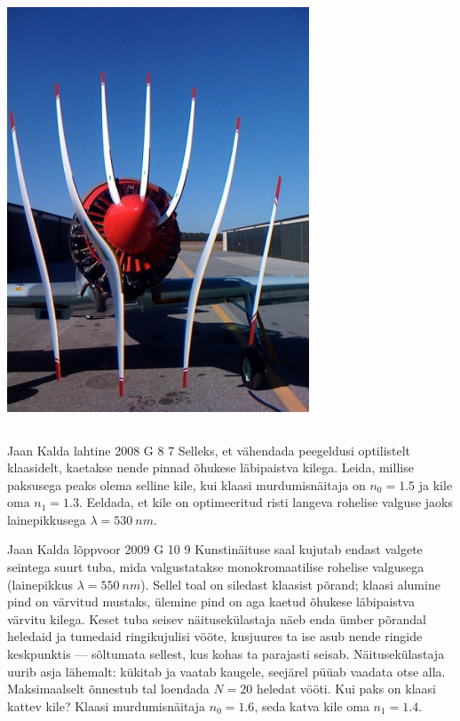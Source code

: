 \documentclass[11pt, twoside]{article}
\begin{document}
{{\begin{center}
	\includegraphics[width=90mm]{2010-v3g-10-Propeller.jpg}
\end{center}
\fi
}
\newpage\subsection{\protect{}}

{Jaan Kalda} %
{lahtine} %
{2008} %
{G 8} %
{7} %
{
\ifStatement
Selleks, et vähendada peegeldusi optilistelt klaasidelt, kaetakse nende pinnad õhukese läbipaistva kilega. Leida, millise paksusega peaks olema selline kile, kui klaasi murdumisnäitaja on $n_0 = \num{1,5}$ ja kile oma $n_1 = \num{1,3}$. Eeldada, et kile on optimeeritud risti langeva rohelise valguse jaoks lainepikkusega $\lambda = \SI{530}{nm}$.
\fi
}

{Jaan Kalda} %
{lõppvoor} %
{2009} %
{G 10} %
{9} %
{
\ifStatement
Kunstinäituse saal kujutab endast valgete seintega suurt tuba, mida valgustatakse monokromaatilise rohelise valgusega (lainepikkus $\lambda=\SI{550}{nm}$).
Sellel toal on siledast klaasist põrand; klaasi
alumine pind on värvitud mustaks, ülemine pind on aga kaetud õhukese läbipaistva värvitu kilega.
Keset tuba seisev näitusekülastaja
näeb enda ümber põrandal heledaid ja tumedaid ringikujulisi vööte, kusjuures ta ise asub nende ringide keskpunktis --- sõltumata sellest, kus kohas ta parajasti seisab. Näitusekülastaja uurib asja lähemalt: kükitab ja vaatab kaugele, seejärel püüab vaadata otse alla. Maksimaalselt õnnestub tal loendada $N=\num{20}$ heledat vööti. Kui paks on klaasi kattev kile?
Klaasi murdumisnäitaja $n_0=\num{1.6}$, seda katva kile oma $n_1=\num{1.4}$.
\fi
}
\newpage\subsection{\protect{}}

}
\end{document}
